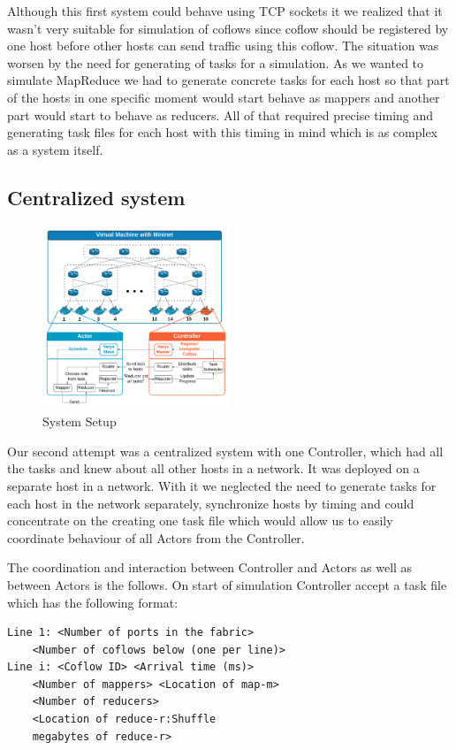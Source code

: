 \documentclass[conference]{IEEEtran}
\begin{document}
Although this first system could behave using TCP sockets it we realized that it wasn’t very suitable for simulation of coflows since coflow should be registered by one host before other hosts can send traffic using this coflow. The situation was worsen by the need for generating of tasks for a simulation. As we wanted to simulate MapReduce we had to generate concrete tasks for each host so that part of the hosts in one specific moment would start behave as mappers and another part would start to behave as reducers. All of that required precise timing and generating task files for each host with this timing in mind which is as complex as a system itself.

\subsection{Centralized system}

\begin{figure}
\includegraphics[width=0.5\textwidth]{setup.png}\caption{System Setup}
\end{figure}

Our second attempt was a centralized system with one Controller, which had all the tasks and knew about all other hosts in a network. It was deployed on a separate host in a network. With it we neglected the need to generate tasks for each host in the network separately, synchronize hosts by timing and could concentrate on the creating one task file which would allow us to easily coordinate behaviour of all Actors from the Controller.

The coordination and interaction between Controller and Actors as well as between Actors is the follows. On start of simulation Controller accept a task file which has the following format:

\begin{lstlisting}
Line 1: <Number of ports in the fabric> 
    <Number of coflows below (one per line)>
Line i: <Coflow ID> <Arrival time (ms)>
    <Number of mappers> <Location of map-m> 
    <Number of reducers> 
    <Location of reduce-r:Shuffle
    megabytes of reduce-r>
\end{lstlisting}
\end{document}
